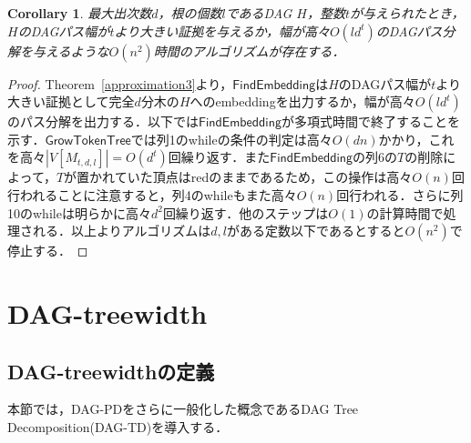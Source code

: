 \documentclass[master]{kuisthesis}		%
\theoremstyle{plain}
\newtheorem{cor}{Corollary}
\theoremstyle{definition}
\begin{document}
\begin{cor}
    最大出次数$d$，根の個数$l$であるDAG $H$，整数$t$が与えられたとき，$H$のDAGパス幅が$t$より大きい証拠を与えるか，幅が高々$O(ld^t)$のDAGパス分解を与えるような$O(n^2)$時間のアルゴリズムが存在する．
\end{cor}

\begin{proof}
    Theorem~\ref{approximation3}より，$\mathsf{FindEmbedding}$は$H$のDAGパス幅が$t$より大きい証拠として完全$d$分木の$H$へのembeddingを出力するか，幅が高々$O(ld^t)$のパス分解を出力する．以下では$\mathsf{FindEmbedding}$が多項式時間で終了することを示す．$\mathsf{GrowTokenTree}$では列1のwhileの条件の判定は高々$O(dn)$かかり，これを高々$|V[M_{t, d, l}]| = O(d^t)$回繰り返す．また$\mathsf{FindEmbedding}$の列6の$T$の削除によって，$T$が置かれていた頂点はredのままであるため，この操作は高々$O(n)$回行われることに注意すると，列4のwhileもまた高々$O(n)$回行われる．さらに列10のwhileは明らかに高々$d^2$回繰り返す．他のステップは$O(1)$の計算時間で処理される．以上よりアルゴリズムは$d, l$がある定数以下であるとすると$O(n^2)$で停止する．
\end{proof}



















\section{DAG-treewidth} %

\subsection{DAG-treewidthの定義}

本節では，DAG-PDをさらに一般化した概念であるDAG Tree Decomposition(DAG-TD)を導入する．
\end{document}
